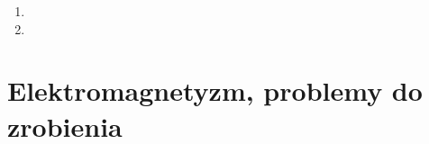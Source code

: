 \documentclass[a4paper,11pt]{article}
\begin{document}
\begin{enumerate}
\item



\item










\end{enumerate}










\section{Elektromagnetyzm, problemy do zrobienia}


\end{document}
